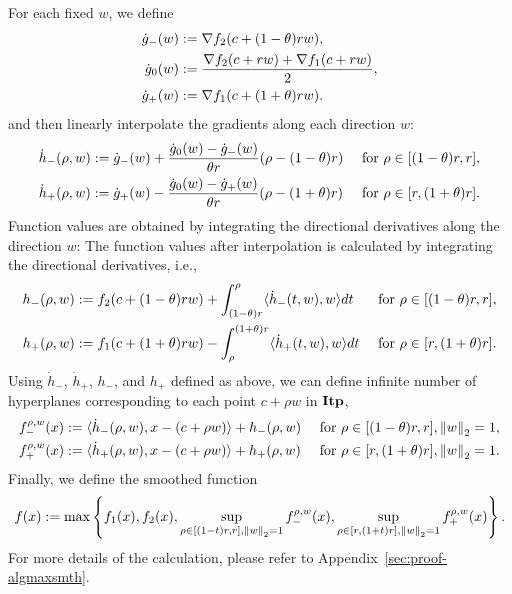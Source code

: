 For each fixed $w$, we define
\begin{align*}
	\dot g_-(w) &:= \nabla f_{2} (c+(1-\theta)rw),\\
	\dot g_0(w) &:= \frac{\nabla f_{2} (c+rw)+\nabla f_{1} (c+rw)}{2},\\
	\dot g_+(w) &:= \nabla f_{1} (c+(1+\theta)rw).
\end{align*}
and then linearly interpolate the gradients along each direction $w$:
\begin{align*}
	\dot h_-(\rho,w) 
	&:= \dot g_-(w) + \frac{\dot g_0(w) - \dot g_-(w)}{\theta r} (\rho-(1-\theta) r) 
	&\text{ for } \rho \in [(1-\theta)r,r], \\
	\dot h_+(\rho,w) 
	&:= \dot g_+(w) - \frac{\dot g_0(w) - \dot g_+(w)}{\theta r} (\rho-(1+\theta) r)
	& \text{ for } \rho \in [r,(1+\theta)r].
\end{align*}
Function values are obtained by integrating the directional derivatives along the direction $w$:
The function values after interpolation is calculated by integrating the directional derivatives, i.e.,
\begin{align*}
	h_-(\rho,w)
	& := 	f_{2}(c+(1-\theta)rw) + 
	\int_{(1-\theta)r}^\rho 
	\langle
	\dot h_-(t,w), w
	\rangle
	dt
	& \text{ for } \rho \in [(1-\theta)r,r],\\
	h_+(\rho,w)
	& := 	f_{1}(c+(1+\theta)rw) -
	\int_\rho^{(1+\theta)r}
	\langle
	\dot h_+(t,w), w
	\rangle
	dt
	& \text{ for } \rho \in [r,(1+\theta)r].
\end{align*}
Using $\dot h_-$, $\dot h_+$, $h_-$, and $h_+$ defined as above, we can define 
infinite number of hyperplanes corresponding to each point $c+\rho w$ in $\mathbf{Itp}$,
\begin{align*}
	f_-^{\rho, w} (x) &:= \langle \dot h_-(\rho,w), x-(c+\rho w) \rangle +h_-(\rho,w) 
	& \text{ for } \rho \in [(1-\theta)r,r], \left\|{w}\right\|_2 = 1,\\
	f_+^{\rho, w} (x) &:= \langle \dot h_+(\rho,w), x-(c+\rho w) \rangle +h_+(\rho,w) 
	& \text{ for } \rho \in [r,(1+\theta)r], \left\|{w}\right\|_2 = 1.
\end{align*}
Finally, we define the smoothed function
\begin{equation*}
	f(x) := \max \left \{ 
	f_{1}(x), f_{2}(x), 
	\sup_{\rho \in [(1-t)r,r], \left\|{w}\right\|_2 = 1} f_-^{\rho, w}(x),
	\sup_{\rho \in [r,(1+t)r], \left\|{w}\right\|_2 = 1} f_+^{\rho, w}(x)
	\right \}.
\end{equation*}
For more details of the calculation, please refer to Appendix~\ref{sec:proof-algmaxsmth}.

